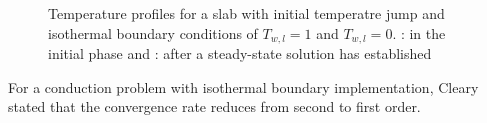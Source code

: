 \documentclass{report}
\begin{document}


\begin{figure}[!htbp]
\centering
\label{fig:PureHeat_Isothermal}

\caption[Temperature profiles for slab with isothermal edges]{Temperature profiles for a slab with initial temperatre jump and isothermal boundary conditions of $T_{w,l}=1$ and $T_{w,l}=0$. : in the initial phase and : after a steady-state solution has established}

\end{figure}

For a conduction problem with isothermal boundary implementation, Cleary \cite{Cleary1999} stated that the convergence rate reduces from second to first order. 
\end{document}
